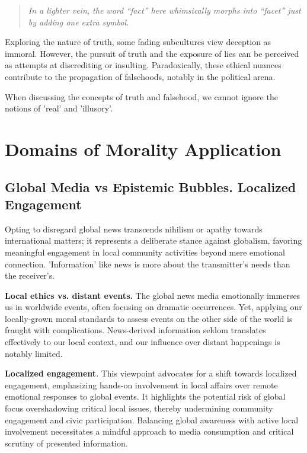 \documentclass[11pt,a4]{article}
\begin{document}
    \begin{quote}
        \textit{In a lighter vein, the word “fact” here whimsically morphs into “facet” just by adding one extra symbol.
    }
    \end{quote}

    Exploring the nature of truth, some fading subcultures view deception as immoral. However, the pursuit of truth and the exposure of lies can be perceived as attempts at discrediting or insulting. Paradoxically, these ethical nuances contribute to the propagation of falsehoods, notably in the political arena.

    When discussing the concepts of truth and falsehood, we cannot ignore the notions of 'real' and 'illusory'.


\newpage
\section{Domains of Morality Application  }
    \subsection{Global Media vs Epistemic Bubbles. Localized Engagement}

    Opting to disregard global news transcends nihilism or apathy
    towards international matters; it represents a deliberate stance
    against globalism, favoring meaningful engagement in local community
    activities beyond mere emotional connection.    'Information' like
    news is  more about the transmitter's needs than the receiver's.

    \textbf{Local ethics vs. distant events.} The global news media emotionally
    immerses us in worldwide events, often focusing on dramatic occurrences.
    Yet,  applying our locally-grown moral standards to assess events on
    the other side of the world is fraught with complications.
    News-derived information seldom translates effectively to our
    local context, and our influence over distant happenings is notably limited.

    \textbf{Localized engagement}. This viewpoint
    advocates for a shift towards localized engagement, emphasizing
    hands-on involvement in local affairs over remote
    emotional responses to global events.
    It highlights the potential risk of global focus overshadowing critical
    local issues, thereby undermining community engagement and civic participation.
    Balancing global awareness with active local involvement necessitates
    a mindful approach to media consumption and critical scrutiny of
    presented information.
\end{document}
